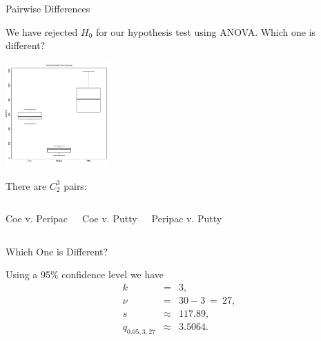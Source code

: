 \begin{frame}{Pairwise Differences}

  We have rejected $H_0$ for our hypothesis test using ANOVA. Which
  one is different?

  \centerline{\includegraphics[width=4cm]{img/periodontalBoxplot}}

  \vfill

  There are $C^3_2$ pairs:

  \begin{columns}

      Coe v. Peripac


       Coe v. Putty 


      Peripac v. Putty 


  \end{columns}



\end{frame}


\begin{frame}{Which One is Different?}

  Using a 95\% confidence level we have
  \begin{eqnarray*}
    k & = & 3, \\
    \nu & = & 30-3 ~ = ~ 27, \\
    s & \approx & 117.89, \\
    q_{0.05,3,27} & \approx & 3.5064.
  \end{eqnarray*}


\end{frame}



